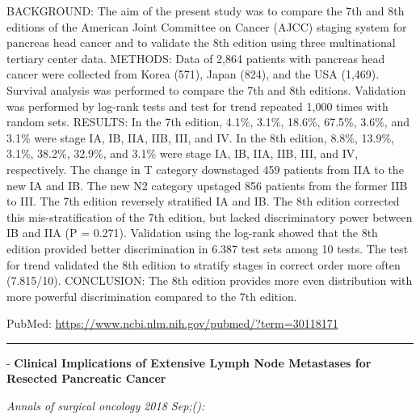 \documentclass[]{article}
\begin{document}
BACKGROUND: The aim of the present study was to compare the 7th and 8th
editions of the American Joint Committee on Cancer (AJCC) staging system
for pancreas head cancer and to validate the 8th edition using three
multinational tertiary center data. METHODS: Data of 2,864 patients with
pancreas head cancer were collected from Korea (571), Japan (824), and
the USA (1,469). Survival analysis was performed to compare the 7th and
8th editions. Validation was performed by log-rank tests and test for
trend repeated 1,000 times with random sets. RESULTS: In the 7th
edition, 4.1\%, 3.1\%, 18.6\%, 67.5\%, 3.6\%, and 3.1\% were stage IA,
IB, IIA, IIB, III, and IV. In the 8th edition, 8.8\%, 13.9\%, 3.1\%,
38.2\%, 32.9\%, and 3.1\% were stage IA, IB, IIA, IIB, III, and IV,
respectively. The change in T category downstaged 459 patients from IIA
to the new IA and IB. The new N2 category upstaged 856 patients from the
former IIB to III. The 7th edition reversely stratified IA and IB. The
8th edition corrected this mis-stratification of the 7th edition, but
lacked discriminatory power between IB and IIA (P = 0.271). Validation
using the log-rank showed that the 8th edition provided better
discrimination in 6.387 test sets among 10 tests. The test for trend
validated the 8th edition to stratify stages in correct order more often
(7.815/10). CONCLUSION: The 8th edition provides more even distribution
with more powerful discrimination compared to the 7th edition.

PubMed: \url{https://www.ncbi.nlm.nih.gov/pubmed/?term=30118171}

{}

{}

\begin{center}\rule{0.5\linewidth}{\linethickness}\end{center}

 - \textbf{Clinical Implications of Extensive Lymph Node Metastases for
Resected Pancreatic Cancer}

\emph{Annals of surgical oncology 2018 Sep;():}
\end{document}
